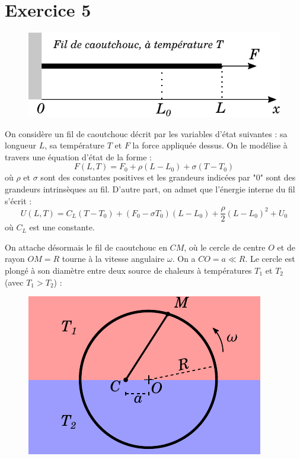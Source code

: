 \documentclass{report}
\begin{document}
\newpage

\section*{Exercice 5}

\begin{figure}[!h]
\centering
\includegraphics[width=0.4\linewidth]{thermo2.pdf}
\end{figure}

On considère un fil de caoutchouc décrit par les variables d'état suivantes : sa longueur $L$, sa température $T$ et $F$ la force appliquée dessus. On le modélise à travers une équation d'état de la forme : 
\begin{equation}
	F(L,T) = F_0 + \rho(L-L_0) + \sigma(T-T_0)
\end{equation}
où $\rho$ et $\sigma$ sont des constantes positives et les grandeurs indicées par "0" sont des grandeurs intrinsèques au fil. D'autre part, on admet que l'énergie interne du fil s'écrit : 
\begin{equation}
	U(L,T) = C_L(T-T_0)+(F_0-\sigma T_0)(L-L_0) +\frac{ \rho}{2}(L-L_0)^2 +U_0
\end{equation}
où $C_L$ est une constante. 

On attache désormais le fil de caoutchouc en $CM$, où le cercle de centre $O$ et de rayon $OM=R$ tourne à la vitesse angulaire $\omega$. On a $CO=a\ll R$. Le cercle est plongé à son diamètre entre deux source de chaleurs à températures $T_1$ et $T_2$  (avec $T_1>T_2$) :

\begin{figure}[!h]
\centering
\includegraphics[width=0.3\linewidth]{thermo3.pdf}
\end{figure}
\end{document}
